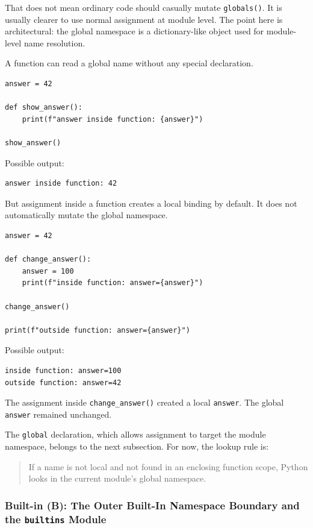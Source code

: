 That does not mean ordinary code should casually mutate \texttt{globals()}. It is usually clearer to use normal assignment at module level. The point here is architectural: the global namespace is a dictionary-like object used for module-level name resolution.

A function can read a global name without any special declaration.

\begin{verbatim}
answer = 42

def show_answer():
    print(f"answer inside function: {answer}")

show_answer()
\end{verbatim}

Possible output:

\begin{verbatim}
answer inside function: 42
\end{verbatim}

But assignment inside a function creates a local binding by default. It does not automatically mutate the global namespace.

\begin{verbatim}
answer = 42

def change_answer():
    answer = 100
    print(f"inside function: answer={answer}")

change_answer()

print(f"outside function: answer={answer}")
\end{verbatim}

Possible output:

\begin{verbatim}
inside function: answer=100
outside function: answer=42
\end{verbatim}

The assignment inside \texttt{change\_answer()} created a local \texttt{answer}. The global \texttt{answer} remained unchanged.

The \texttt{global} declaration, which allows assignment to target the module namespace, belongs to the next subsection. For now, the lookup rule is:

\begin{quote}
If a name is not local and not found in an enclosing function scope, Python looks in the current module's global namespace.
\end{quote}

\subsubsection{Built-in (B): The Outer Built-In Namespace Boundary and the \texttt{builtins} Module}

